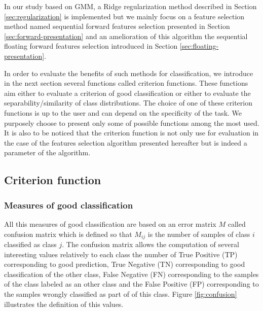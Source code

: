 \documentclass[a4paper,11pt,DIV=16]{scrartcl}
\begin{document}
    In our study based on GMM, a Ridge regularization method described in Section \ref{sec:regularization} is implemented but we mainly focus on a feature selection method named sequential forward features selection presented in Section \ref{sec:forward-presentation} and an amelioration of this algorithm the sequential floating forward features selection introduced in Section \ref{sec:floating-presentation}.

    In order to evaluate the benefits of such methods for classification, we introduce in the next section several functions called criterion functions. These functions aim either to evaluate a criterion of good classification or either to evaluate the separability/similarity of class distributions. The choice of one of these criterion functions is up to the user and can depend on the specificity of the task. We purposely choose to present only some of possible functions among the most used. It is also to be noticed that the criterion function is not only use for evaluation in the case of the features selection algorithm presented hereafter but is indeed a parameter of the algorithm.


    \subsection{Criterion function}
    \label{sec:criterion}

        \subsubsection{Measures of good classification}

        All this measures of good classification are based on an error matrix $M$ called confusion matrix which is defined so that $M_{ij}$ is the number of samples of class $i$ classified as class $j$. The confusion matrix allows the computation of several interesting values relatively to each class the number of True Positive (TP) corresponding to good prediction, True Negative (TN) corresponding to good classification of the other class, False Negative (FN) corresponding to the samples of the class labeled as an other class and the False Positive (FP) corresponding to the samples wrongly classified as part of of this class. Figure \ref{fig:confusion} illustrates the definition of this values.
\end{document}
